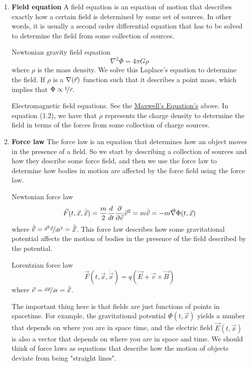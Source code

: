 \documentclass{article}
\begin{document}
 		\begin{enumerate}
 			\item \textbf{Field equation}
 				\subitem A field equation is an equation of motion that describes exactly how a certain field is determined by some set of sources. In other words, it is usually a second order differential equation that has to be solved to determine the field from some collection of sources. 
 			\begin{exmp}
 				Newtonian gravity field equation
 				$$ \nabla^2 \Phi = 4\pi G \rho$$
 				where $\rho$ is the mass density. We solve this Laplace's equation to determine the field. If $\rho$ is a $\nabla(\vec{r})$ function such that it describes a point mass, which implies that
 				$\Phi \propto \nicefrac{1}{\vec{r}}$.
 			\end{exmp}
	 		\begin{exmp}
	 			Electromagnetic field equations. See the \hyperref[eq:Maxwell]{Maxwell's Equation's} above. In equation (1.2), we have that $\rho$ represents the charge density to determine the field in terms of the forces from some collection of charge sources.
	 		\end{exmp}
 		\pagebreak
 			\item \textbf{Force law}
 			\subitem The force law is an equation that determines how an object moves in the presence of a field. So we start by describing a collection of sources and how they describe some force field, and then we use the force law to determine how bodies in motion are affected by the force field using the force law.
 			\begin{exmp}
 				Newtonian force law
 				$$ \vec{F}(t, \vec{x}, \dot{\vec{x}}) = \frac{m}{2}\frac{d}{dt} \frac{\partial}{\partial \vec{v}}\vec{v}^2 = m \dot{\vec{v}} =- m \vec{\nabla} \Phi(t,\vec{x}) $$
 				where $\dot{\vec{v}} = \nicefrac{d^2 \vec{x}}{dt^2} = \ddot{\vec{x}}$. This force law describes how some gravitational potential affects the motion of bodies in the presence of the field described by the potential.
 			\end{exmp}
 			\begin{exmp}
 				Lorentzian force law
 				$$ \vec{F} \left(t, \vec{x}, \dot{\vec{x}}\right)=q (\vec{E} + \vec{v} \times \vec{B} )$$
 				where $\vec{v} = \nicefrac{d\vec{x}}{dt} = \dot{\vec{x}}$.
 			\end{exmp}
 			The important thing here is that fields are just functions of points in spacetime. For example, the gravitational potential $\Phi (t, \vec{x})$ yields a number that depends on where you are in space time, and the electric field $\vec{E} (t, \vec{x})$ is also a vector that depends on where you are in space and time. We should think of force laws as equations that describe how the motion of objects deviate from being "straight lines". 
 		\end{enumerate}
\end{document}
